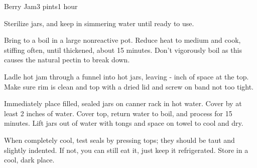 \documentclass[../Cookbook.tex]{subfiles}
\begin{document}
\begin{recipe}{Berry Jam}{3 pints}{1 hour}

Sterilize jars, and keep in simmering water until ready to use.

Bring to a boil in a large nonreactive pot. Reduce heat to medium and cook, stiffing often, until thickened, about 15 minutes. Don't vigorously boil as this causes the natural pectin to break down.

Ladle hot jam through a funnel into hot jars, leaving - inch of space at the top. Make sure rim is clean and top with a dried lid and screw on band not too tight.

Immediately place filled, sealed jars on canner rack in hot water. Cover by at least 2 inches of water. Cover top, return water to boil, and process for 15 minutes. %
Lift jars out of water with tongs and space on towel to cool and dry.

When completely cool, test seals by pressing tops; they should be taut and slightly indented. If not, you can still eat it, just keep it refrigerated. Store in a cool, dark place.

\end{recipe}
\end{document}
